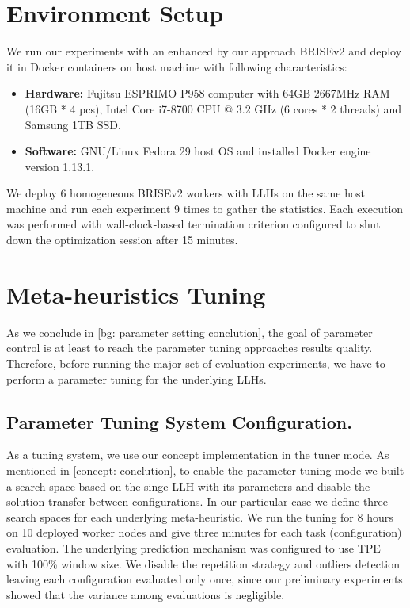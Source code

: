 \section{Environment Setup}\label{eval: environment}
We run our experiments with an enhanced by our approach BRISEv2 and deploy it in Docker containers on host machine with following characteristics:
\begin{itemize}
	\item \textbf{Hardware:} Fujitsu ESPRIMO P958 computer with 64GB 2667MHz RAM (16GB * 4 pcs), Intel Core i7-8700 CPU @ 3.2 GHz (6 cores * 2 threads) and Samsung 1TB SSD.
	
	\item \textbf{Software:} GNU/Linux Fedora 29 host OS and installed Docker engine version 1.13.1.
\end{itemize}

We deploy 6 homogeneous BRISEv2 workers with LLHs on the same host machine and run each experiment 9 times to gather the statistics. Each execution was performed with wall-clock-based termination criterion configured to shut down the optimization session after 15 minutes.


\section{Meta-heuristics Tuning}\label{eval: mh tuning}
As we conclude in \cref{bg: parameter setting conclution}, the goal of parameter control is at least to reach the parameter tuning approaches results quality. Therefore, before running the major set of evaluation experiments, we have to perform a parameter tuning for the underlying LLHs.

\subsection{Parameter Tuning System Configuration.} 
As a tuning system, we use our concept implementation in the tuner mode. As mentioned in \cref{concept: conclution}, to enable the parameter tuning mode we built a search space based on the singe LLH with its parameters and disable the solution transfer between configurations. In our particular case we define three search spaces for each underlying meta-heuristic. We run the tuning for 8 hours on 10 deployed worker nodes and give three minutes for each task (configuration) evaluation. The underlying prediction mechanism was configured to use TPE with 100\% window size. We disable the repetition strategy and outliers detection leaving each configuration evaluated only once, since our preliminary experiments showed that the variance among evaluations is negligible.


